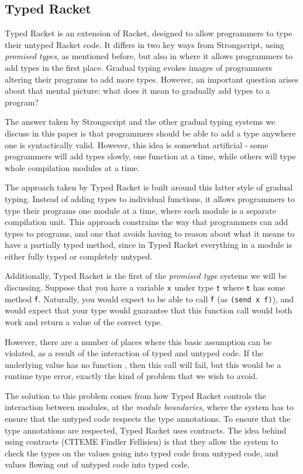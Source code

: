 \documentclass[preprint]{sigplanconf}
\newcommand{\x}{\M{\xt{x}}}
\renewcommand{\t}{\M{\xt{t}}}
\newcommand{\M}[1]{\ensuremath{#1}\xspace}
\newcommand{\xt}[1]{{\sf{#1}}\xspace}
\begin{document}
\subsection{Typed Racket}

Typed Racket is an extension of Racket, designed to allow programmers to type
their untyped Racket code. It differs in two key ways from Strongscript, using \emph{promised
types}, as mentioned before, but also in where it allows
programmers to add types in the first place. Gradual typing evokes images of 
programmers altering their programs to add more types. However, an important question arises about 
that mental picture: what does it mean to gradually add types to a program?

The answer taken by Strongscript and the other gradual typing systems we discuss in this 
paper is that programmers should be able to add a type anywhere one is syntactically
valid. However, this idea is somewhat artificial - some programmers will add types
slowly, one function at a time, while others will type whole compilation modules
at a time.

The approach taken by Typed Racket is built around this latter style of gradual typing.
Instead of adding types to individual functions, it allows programmers to type their 
programs one module at a time, where each module is a separate compilation unit.
This approach constrains the way that programmers can add types to programs,
and one that avoids having to reason about what it means to have a partially typed method,
since in Typed Racket everything in a module is either fully typed or completely untyped.

Additionally, Typed Racket is the first of the \emph{promised type} systems we will be discussing. Suppose
that you have a variable $\x$ under type $\t$ where $\t$ has some method $\xt{f}$. Naturally, 
you would expect to be able to call $\xt{f}$ (as \verb|(send x f)|), and would expect that 
your type would guarantee that this function call would both work and return a value of the
correct type.

However, there are a number of places where this basic assumption can be violated,
as a result of the interaction of typed and untyped code. If the underlying value has
no function \xt{f}, then this call will fail, but this would be a runtime type error,
exactly the kind of problem that we wish to avoid.

The solution to this problem comes from how Typed Racket controls the interaction between 
modules, at the \emph{module boundaries}, where the system has to ensure that the untyped code
respects the type annotations. To ensure that the type annotations are respected, Typed Racket uses
 contracts. The idea behind using contracts (CITEME Findler Fellisien) is that they allow the system
to check the types on the values going into typed code from untyped code, and values
flowing out of untyped code into typed code.
\end{document}
